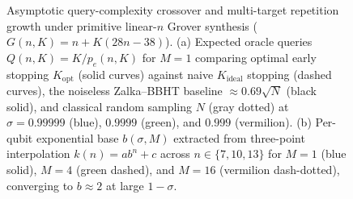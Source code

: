 \begin{figure}[t]
\caption{Asymptotic query-complexity crossover and multi-target repetition growth under primitive linear-$n$ Grover synthesis ($G(n, K) = n + K(28n - 38)$). (a) Expected oracle queries $Q(n, K) = K / p_e(n, K)$ for $M = 1$ comparing optimal early stopping $K_{\mathrm{opt}}$ (solid curves) against naive $K_{\mathrm{ideal}}$ stopping (dashed curves), the noiseless Zalka--BBHT baseline $\approx 0.69\sqrt{N}$ (black solid), and classical random sampling $N$ (gray dotted) at $\sigma = 0.99999$ (blue), $0.9999$ (green), and $0.999$ (vermilion). (b) Per-qubit exponential base $b(\sigma, M)$ extracted from three-point interpolation $k(n) = a b^n + c$ across $n \in \{7, 10, 13\}$ for $M = 1$ (blue solid), $M = 4$ (green dashed), and $M = 16$ (vermilion dash-dotted), converging to $b \approx 2$ at large $1 - \sigma$.}
\label{fig:complexity-crossover}
\end{figure}
